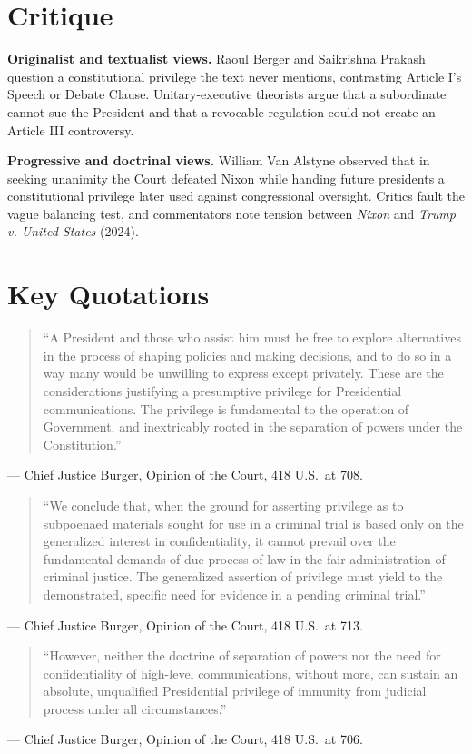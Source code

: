\documentclass[12pt]{article}
\begin{document}
\section{Critique}

\textbf{Originalist and textualist views.} Raoul Berger and Saikrishna Prakash question a constitutional privilege the text never mentions, contrasting Article I's Speech or Debate Clause. Unitary-executive theorists argue that a subordinate cannot sue the President and that a revocable regulation could not create an Article III controversy.

\textbf{Progressive and doctrinal views.} William Van Alstyne observed that in seeking unanimity the Court defeated Nixon while handing future presidents a constitutional privilege later used against congressional oversight. Critics fault the vague balancing test, and commentators note tension between \textit{Nixon} and \textit{Trump v. United States} (2024).

\section{Key Quotations}

\begin{quote}
``A President and those who assist him must be free to explore alternatives in the process of shaping policies and making decisions, and to do so in a way many would be unwilling to express except privately. These are the considerations justifying a presumptive privilege for Presidential communications. The privilege is fundamental to the operation of Government, and inextricably rooted in the separation of powers under the Constitution.''
\end{quote}
\noindent --- Chief Justice Burger, Opinion of the Court, 418 U.S.\ at 708.

\begin{quote}
``We conclude that, when the ground for asserting privilege as to subpoenaed materials sought for use in a criminal trial is based only on the generalized interest in confidentiality, it cannot prevail over the fundamental demands of due process of law in the fair administration of criminal justice. The generalized assertion of privilege must yield to the demonstrated, specific need for evidence in a pending criminal trial.''
\end{quote}
\noindent --- Chief Justice Burger, Opinion of the Court, 418 U.S.\ at 713.

\begin{quote}
``However, neither the doctrine of separation of powers nor the need for confidentiality of high-level communications, without more, can sustain an absolute, unqualified Presidential privilege of immunity from judicial process under all circumstances.''
\end{quote}
\noindent --- Chief Justice Burger, Opinion of the Court, 418 U.S.\ at 706.
\end{document}
